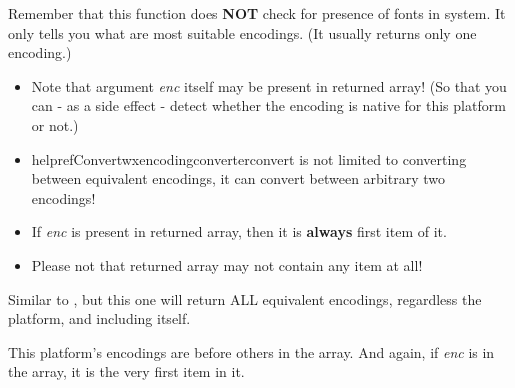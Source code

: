 Remember that this function does {\bf NOT} check for presence of
fonts in system. It only tells you what are most suitable
encodings. (It usually returns only one encoding.)


\begin{itemize}
\item Note that argument {\it enc} itself may be present in returned array!
(So that you can - as a side effect - detect whether the
encoding is native for this platform or not.)

\item helpref{Convert}{wxencodingconverterconvert} is not limited to 
converting between equivalent encodings, it can convert between arbitrary
two encodings!

\item If {\it enc} is present in returned array, then it is {\bf always} first
item of it.

\item Please not that returned array may not contain any item at all!
\end{itemize}


\label{wxencodingconvertergetallequivalents}


Similar to 
, 
but this one will return ALL 
equivalent encodings, regardless the platform, and including itself.

This platform's encodings are before others in the array. And again, if {\it enc} is in the array,
it is the very first item in it.
